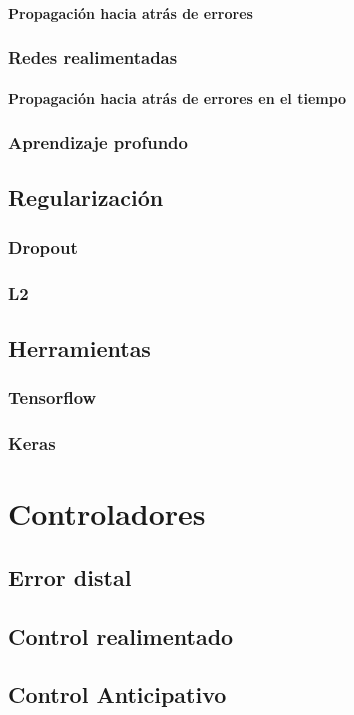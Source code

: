 \paragraph{Propagación hacia atrás de errores}
\subsubsection{Redes realimentadas}
\paragraph{Propagación hacia atrás de errores en el tiempo}
\subsubsection{Aprendizaje profundo}
\subsection{Regularización}
\subsubsection{Dropout}
\subsubsection{L2}
\subsection{Herramientas}
\subsubsection{Tensorflow}
\subsubsection{Keras}
\section{Controladores}
\subsection{Error distal}
\subsection{Control realimentado}
\subsection{Control Anticipativo}